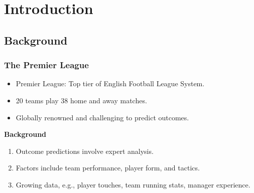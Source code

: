 \documentclass{beamer}
\begin{document}
% 
\begin{frame}
  \titlepage
\end{frame}
% 
% 
\begin{frame}
  \tableofcontents
\end{frame}
% 
% 
% 
% 
% 
% 
\section{Introduction}
\subsection{Background}
\begin{frame}
  \frametitle{The Premier League}
  \begin{itemize}
    \item Premier League: Top tier of English Football League System.
    \item 20 teams play 38 home and away matches.
    \item Globally renowned and challenging to predict outcomes.
  \end{itemize}
  
  \textbf{Background}
  
  \begin{enumerate}
    \item Outcome predictions involve expert analysis.
    \item Factors include team performance, player form, and tactics.
    \item Growing data, e.g., player touches, team running stats, manager experience.
  \end{enumerate}
\end{frame}
\end{document}
